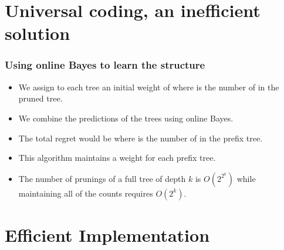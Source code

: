 \documentclass{beamer}
\begin{document}

\section{Universal coding, an inefficient solution}

\begin{frame}
\frametitle{Using online Bayes to learn the structure}
\begin{itemize}
\item We assign to each tree an initial weight of  where
   is the number of  in the  pruned tree.
\item We combine the predictions of the trees using online Bayes.
\item The total regret would be  where  is the number of  in the prefix tree.
\item This algorithm maintains a weight for each prefix tree.
\item The number of prunings of a full tree of depth $k$ is
  $O(2^{2^k})$ while maintaining all of the counts requires $O(2^k)$. 
\end{itemize}
\end{frame}


\section{Efficient Implementation}

\end{document}
